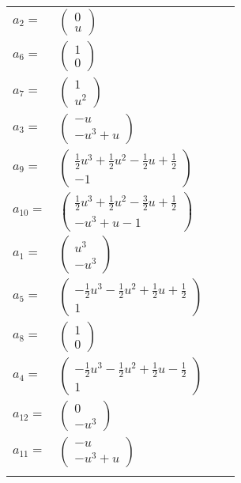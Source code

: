 \documentclass[1p]{elsarticle_modified}
\theoremstyle{definition}
\begin{document}
\begin{tabular}{m{7pt} m{180pt} m{7pt} m{180pt} }
\flushright $a_{2}=$&$\begin{pmatrix}0\\u\end{pmatrix}$ \\
\flushright $a_{6}=$&$\begin{pmatrix}1\\0\end{pmatrix}$ \\
\flushright $a_{7}=$&$\begin{pmatrix}1\\u^2\end{pmatrix}$ \\
\flushright $a_{3}=$&$\begin{pmatrix}- u\\- u^3+u\end{pmatrix}$ \\
\flushright $a_{9}=$&$\begin{pmatrix}\frac{1}{2} u^3+\frac{1}{2} u^2-\frac{1}{2} u+\frac{1}{2}\\-1\end{pmatrix}$ \\
\flushright $a_{10}=$&$\begin{pmatrix}\frac{1}{2} u^3+\frac{1}{2} u^2-\frac{3}{2} u+\frac{1}{2}\\- u^3+u-1\end{pmatrix}$ \\
\flushright $a_{1}=$&$\begin{pmatrix}u^3\\- u^3\end{pmatrix}$ \\
\flushright $a_{5}=$&$\begin{pmatrix}-\frac{1}{2} u^3-\frac{1}{2} u^2+\frac{1}{2} u+\frac{1}{2}\\1\end{pmatrix}$ \\
\flushright $a_{8}=$&$\begin{pmatrix}1\\0\end{pmatrix}$ \\
\flushright $a_{4}=$&$\begin{pmatrix}-\frac{1}{2} u^3-\frac{1}{2} u^2+\frac{1}{2} u-\frac{1}{2}\\1\end{pmatrix}$ \\
\flushright $a_{12}=$&$\begin{pmatrix}0\\- u^3\end{pmatrix}$ \\
\flushright $a_{11}=$&$\begin{pmatrix}- u\\- u^3+u\end{pmatrix}$\\&\end{tabular}
\end{document}
